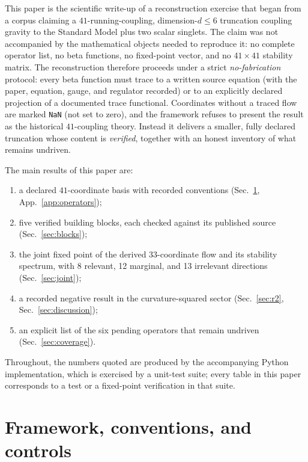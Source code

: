 \documentclass[11pt]{article}
\begin{document}
This paper is the scientific write-up of a reconstruction exercise that began
from a corpus claiming a $41$-running-coupling, dimension-$d\le 6$ truncation
coupling gravity to the Standard Model plus two scalar singlets.  The
claim was not accompanied by the mathematical objects needed to reproduce it:
no complete operator list, no beta functions, no fixed-point vector, and no
$41\times 41$ stability matrix.  The reconstruction therefore proceeds under a
strict \emph{no-fabrication} protocol: every beta function must trace to a
written source equation (with the paper, equation, gauge, and regulator
recorded) or to an explicitly declared projection of a documented trace
functional.  Coordinates without a traced flow are marked \texttt{NaN} (not
set to zero), and the framework refuses to present the result as the
historical $41$-coupling theory.  Instead it delivers a smaller, fully
declared truncation whose content is \emph{verified}, together with an honest
inventory of what remains undriven.

The main results of this paper are:
\begin{enumerate}
  \item a declared $41$-coordinate basis with recorded conventions
        (Sec.~\ref{sec:framework}, App.~\ref{app:operators});
  \item five verified building blocks, each checked against its published
        source (Sec.~\ref{sec:blocks});
  \item the joint fixed point of the derived $33$-coordinate flow and its
        stability spectrum, with 8 relevant, 12 marginal, and 13 irrelevant
        directions (Sec.~\ref{sec:joint});
  \item a recorded negative result in the curvature-squared sector
        (Sec.~\ref{sec:r2}, Sec.~\ref{sec:discussion});
  \item an explicit list of the six pending operators that remain undriven
        (Sec.~\ref{sec:coverage}).
\end{enumerate}

Throughout, the numbers quoted are produced by the accompanying Python
implementation, which is exercised by a unit-test suite; every table in this
paper corresponds to a test or a fixed-point verification in that suite.

\section{Framework, conventions, and controls}
\label{sec:framework}
\end{document}
